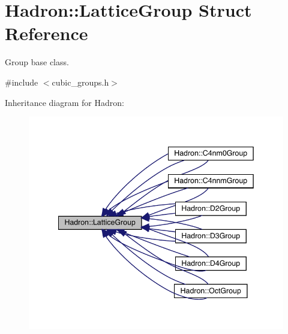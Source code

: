 \hypertarget{structHadron_1_1LatticeGroup}{}\section{Hadron\+:\+:Lattice\+Group Struct Reference}
\label{structHadron_1_1LatticeGroup}


Group base class.  




{\ttfamily \#include $<$cubic\+\_\+groups.\+h$>$}



Inheritance diagram for Hadron\+:
\nopagebreak
\begin{figure}[H]
\begin{center}
\leavevmode
\includegraphics[width=342pt]{d1/d71/structHadron_1_1LatticeGroup__inherit__graph}
\end{center}
\end{figure}

